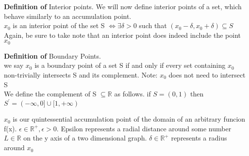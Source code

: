 \documentclass[12pt]{article}
\theoremstyle{definition}
\newenvironment{definition}{\vspace{1em}\noindent\textbf{Definition of}}{\vspace{1em}}
\newenvironment{statement}[2][Section]{\begin{trivlist}
\item[\hskip \labelsep {\bfseries #1}\hskip \labelsep {\bfseries #2.}]}{\end{trivlist}}
\begin{document}
\begin{definition}
Interior points.
We will now define interior points of a set, which behave similarly to an accumulation point.\\
$x_0$ is an interior point of the set S $\iff \exists \delta > 0$ such that $(x_0 - \delta, x_0 + \delta) \subseteq S$\\
Again, be sure to take note that an interior point does indeed include the point $x_0$
\end{definition}

\begin{definition}
Boundary Points.\\
we say $x_0$ is a boundary point of a set S if and only if every set containing $x_0$ non-trivially intersects S and its complement. Note: $x_0$ does not need to intersect S\\
We define the complement of S $\subseteq \mathbb{R}$ as follows.
if $S = (0,1)$ then $S^\prime = (-\infty, 0] \cup [1, +\infty)$



\end{definition}
\begin{statement}{Limits}
$x_0$ is our quintessential accumulation point of the domain of an arbitrary funcion f(x).
$\epsilon \in \mathbb{R}^+ , \epsilon > 0.$ Epsilon represents a radial distance around some number $L \in \mathbb{R}$ on the y axis of a two dimensional graph. $\delta \in \mathbb{R}^+ $ represents a radius around $x_0$

\end{statement}
\newpage
\end{document}
